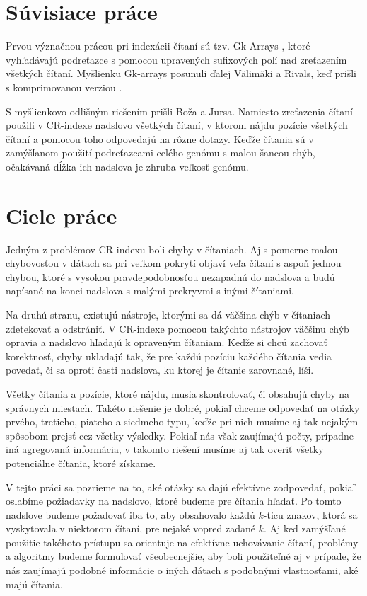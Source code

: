 \section{Súvisiace práce}

Prvou význačnou prácou pri indexácii čítaní sú tzv. Gk-Arrays \cite{gk_arrays}, ktoré
vyhľadávajú podreťazce s pomocou upravených sufixových polí nad zreťazením všetkých
čítaní.
Myšlienku Gk-arrays posunuli ďalej Välimäki a Rivals, keď prišli s komprimovanou
verziou \cite{comp_gk_arrays}.

S myšlienkovo odlišným riešením prišli Boža a Jursa. Namiesto zreťazenia čítaní použili
v CR-indexe \cite{cr_index} nadslovo všetkých čítaní, v ktorom nájdu pozície všetkých čítaní
a pomocou toho odpovedajú na rôzne dotazy. Keďže čítania sú v zamýšľanom použití podreťazcami celého
genómu s malou šancou chýb, očakávaná dĺžka ich nadslova je zhruba veľkosť genómu.

\section{Ciele práce}

Jedným z problémov CR-indexu boli chyby v čítaniach. Aj s pomerne malou chybovosťou
v dátach sa pri veľkom pokrytí objaví veľa čítaní s aspoň jednou chybou, ktoré s vysokou
pravdepodobnosťou nezapadnú do nadslova a budú napísané na konci nadslova s malými
prekryvmi s inými čítaniami.

Na druhú stranu, existujú nástroje, ktorými sa dá väčšina chýb v čítaniach zdetekovať
a odstrániť. V CR-indexe pomocou takýchto nástrojov väčšinu chýb opravia a nadslovo
hľadajú k opraveným čítaniam. Keďže si chcú zachovať korektnosť, chyby ukladajú tak,
že pre každú pozíciu každého čítania vedia povedať, či sa oproti časti nadslova,
ku ktorej je čítanie zarovnané, líši.

Všetky čítania a pozície, ktoré nájdu, musia skontrolovať, či obsahujú chyby na správnych miestach.
Takéto riešenie je dobré, pokiaľ chceme odpovedať na otázky prvého, tretieho, piateho a
siedmeho typu, keďže pri nich musíme aj tak nejakým spôsobom prejsť cez všetky výsledky.
Pokiaľ nás však zaujímajú počty, prípadne iná agregovaná informácia, v takomto riešení
musíme aj tak overiť všetky potenciálne čítania, ktoré získame.

V tejto práci sa pozrieme na to, aké otázky sa dajú efektívne zodpovedať, pokiaľ
oslabíme požiadavky na nadslovo, ktoré budeme pre čítania hľadať. Po tomto nadslove
budeme požadovať iba to, aby obsahovalo každú $k$-ticu znakov, ktorá sa vyskytovala
v niektorom čítaní, pre nejaké vopred zadané $k$. Aj keď zamýšľané použitie takéhoto
prístupu sa orientuje na efektívne uchovávanie čítaní, problémy a algoritmy budeme
formulovať všeobecnejšie, aby boli použiteľné aj v prípade, že nás zaujímajú podobné
informácie o iných dátach s podobnými vlastnosťami, aké majú čítania.

